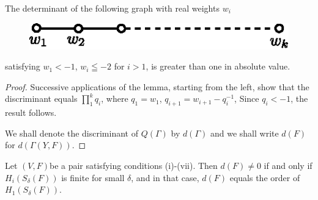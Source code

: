 \begin{coro*}
The determinant of the following graph with real weights $w_i$
\begin{figure}[H]
\hfill
\includegraphics{fig2.eps}\hfill {}
\end{figure}
\noindent
satisfying $w_1 < -1$, $w_i \leqq -2$ for $i > 1$, is greater than one in absolute value.
\end{coro*}

\begin{proof}
Successive applications of the lemma, starting from the left, show that the discriminant equals $\prod^k_1 q_i$, where $q_1 = w_1$, $q_{i+1} = w_{i+1} - q^{-1}_i$, Since $q_i < -1$, the result follows.

We shall denote the discriminant of $Q(\Gamma)$ by $d(\Gamma)$ and we shall write $d(F)$ for $d (\Gamma (Y, F))$.
\end{proof}

\begin{lem}\label{art8-lem3}%
Let $(V, F)$\pageoriginale be a pair satisfying conditions (i)-(vii). Then $d(F) \neq 0$ if and only if $H_i (S_\delta (F))$ is finite for small $\delta$, and in that case, $d(F)$ equals the order of $H_1 (S_\delta (F))$.
\end{lem}


